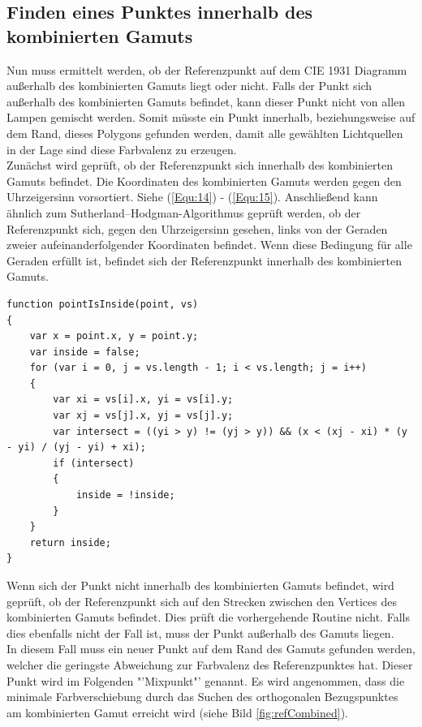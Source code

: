 \documentclass[11pt]{scrartcl}
\begin{document}
\subsection{Finden eines Punktes innerhalb des kombinierten Gamuts}
Nun muss ermittelt werden, ob der Referenzpunkt auf dem CIE 1931 Diagramm außerhalb des kombinierten Gamuts liegt oder nicht. Falls der Punkt sich außerhalb des
kombinierten Gamuts befindet, kann dieser Punkt nicht von allen Lampen gemischt werden. Somit müsste ein Punkt innerhalb, beziehungsweise auf dem Rand,
dieses Polygons gefunden werden, damit alle gewählten Lichtquellen in der Lage sind diese Farbvalenz zu erzeugen.\\
Zunächst wird geprüft, ob der Referenzpunkt sich innerhalb des kombinierten Gamuts befindet. Die Koordinaten des kombinierten Gamuts werden gegen den
Uhrzeigersinn vorsortiert. Siehe (\ref{Equ:14}) - (\ref{Equ:15}). Anschließend kann ähnlich zum Sutherland–Hodgman-Algorithmus geprüft werden, ob
der Referenzpunkt sich, gegen den Uhrzeigersinn gesehen, links von der Geraden zweier aufeinanderfolgender Koordinaten befindet. Wenn diese Bedingung für alle
Geraden erfüllt ist, befindet sich der Referenzpunkt innerhalb des kombinierten Gamuts.\\
\begin{lstlisting}[caption=Punkt in Polygon Check]
function pointIsInside(point, vs)
{
    var x = point.x, y = point.y;
    var inside = false;
    for (var i = 0, j = vs.length - 1; i < vs.length; j = i++)
    {
        var xi = vs[i].x, yi = vs[i].y;
        var xj = vs[j].x, yj = vs[j].y;
        var intersect = ((yi > y) != (yj > y)) && (x < (xj - xi) * (y - yi) / (yj - yi) + xi);
        if (intersect)
        {
            inside = !inside;
        }
    }
    return inside;
}
\end{lstlisting}
Wenn sich der Punkt nicht innerhalb des kombinierten Gamuts befindet, wird geprüft, ob der Referenzpunkt sich auf den Strecken zwischen den Vertices des
kombinierten Gamuts befindet. Dies prüft die vorhergehende Routine nicht. Falls dies ebenfalls nicht der Fall ist, muss der Punkt außerhalb des Gamuts liegen.\\
In diesem Fall muss ein neuer Punkt auf dem Rand des Gamuts gefunden werden, welcher die geringste Abweichung zur Farbvalenz des Referenzpunktes hat. Dieser
Punkt wird im Folgenden "'Mixpunkt"' genannt.
Es wird angenommen, dass die minimale Farbverschiebung durch das Suchen des orthogonalen Bezugspunktes am kombinierten Gamut erreicht wird (siehe
Bild \ref{fig:refCombined}).
\end{document}
